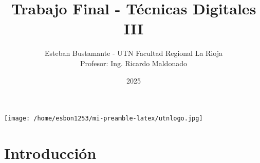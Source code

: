 \documentclass[a4,11pt]{article}
\title{Trabajo Final - Técnicas Digitales III }
\author{Esteban Bustamante - UTN Facultad Regional La Rioja \\ Profesor: Ing. Ricardo Maldonado}
\date{2025}
\begin{document}
\maketitle
\begin{center}
  \texttt{[image: /home/esbon1253/mi-preamble-latex/utnlogo.jpg]}
\end{center}
\pagebreak

\tableofcontents
\pagebreak

\section{Introducción}
\label{sec:introduccion}
\end{document}

